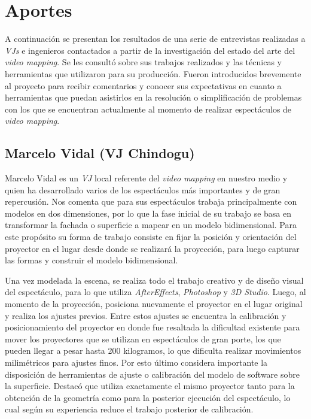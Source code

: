 ﻿\chapter{Aportes}
\label{chapter:aportes}
A continuación se presentan los resultados de una serie de entrevistas realizadas a \emph{VJs} e ingenieros contactados a partir de la investigación del estado del arte del \emph{video mapping}. Se les consultó sobre sus trabajos realizados y las técnicas y herramientas que utilizaron para su producción.
Fueron introducidos brevemente al proyecto para recibir comentarios y conocer sus expectativas en cuanto a herramientas que puedan asistirlos en la resolución o simplificación de problemas con los que se encuentran actualmente al momento de realizar espectáculos de \emph{video mapping}.

\section{Marcelo Vidal (VJ Chindogu)}
Marcelo Vidal\cite{Chindogu} es un \emph{VJ} local referente del \emph{video mapping} en nuestro medio y quien ha desarrollado varios de los espectáculos más importantes y de gran repercusión.
Nos comenta que para sus espectáculos trabaja principalmente con modelos en dos dimensiones, por lo que la fase inicial de su trabajo se basa en transformar la fachada o superficie a mapear en un modelo bidimensional.
Para este propósito su forma de trabajo consiste en fijar la posición y orientación del proyector en el lugar desde donde se realizará la proyección, para luego capturar las formas y construir el modelo bidimensional.

Una vez modelada la escena, se realiza todo el trabajo creativo y de diseño visual del espectáculo, para lo que utiliza \emph{AfterEffects}, \emph{Photoshop} y \emph{3D Studio}. Luego, al momento de la proyección, posiciona nuevamente el proyector en el lugar original y realiza los ajustes previos. Entre estos ajustes se encuentra la calibración y posicionamiento del proyector en donde fue resaltada la dificultad existente para mover los proyectores que se utilizan en espectáculos de gran porte, los que pueden llegar a pesar hasta 200 kilogramos, lo que dificulta realizar movimientos milimétricos para ajustes finos. Por esto último considera importante la disposición de herramientas de ajuste o calibración del modelo de software sobre la superficie. Destacó que utiliza exactamente el mismo proyector tanto para la obtención de la geometría como para la posterior ejecución del espectáculo, lo cual según su experiencia reduce el trabajo posterior de calibración.


